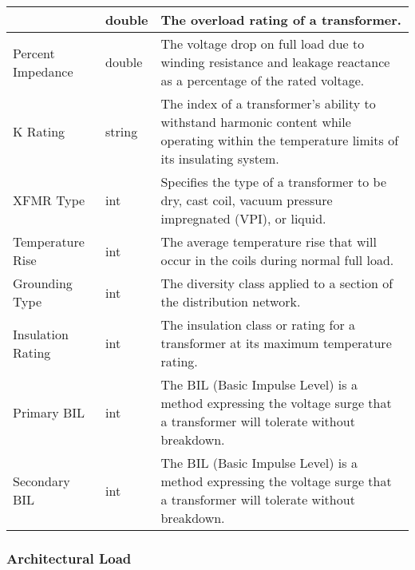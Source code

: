 \documentclass[letterpaper,10pt,english]{sphinxmanual}
\begin{document}
\begin{savenotes}
\begin{tabulary}{\linewidth}[t]{|T|T|T|}
&
double
&
The overload rating of a transformer.
\\
\hline
Percent Impedance
&
double
&
The voltage drop on full load due to winding resistance and leakage reactance as a percentage of the rated voltage.
\\
\hline
K Rating
&
string
&
The index of a transformer’s ability to withstand harmonic content while operating within the temperature limits of its insulating system.
\\
\hline
XFMR Type
&
int
&
Specifies the type of a transformer to be dry, cast coil, vacuum pressure impregnated (VPI), or liquid.
\\
\hline
Temperature Rise
&
int
&
The average temperature rise that will occur in the coils during normal full load.
\\
\hline
Grounding Type
&
int
&
The diversity class applied to a section of the distribution network.
\\
\hline
Insulation Rating
&
int
&
The insulation class or rating for a transformer at its maximum temperature rating.
\\
\hline
Primary BIL
&
int
&
The BIL (Basic Impulse Level) is a method expressing the voltage surge that a transformer will tolerate without breakdown.
\\
\hline
Secondary BIL
&
int
&
The BIL (Basic Impulse Level) is a method expressing the voltage surge that a transformer will tolerate without breakdown.
\\
\hline
\end{tabulary}
\par
\sphinxattableend\end{savenotes}


\subsubsection{Architectural Load}
\label{\detokenize{docs/definitions/index-definitions:architectural-load}}\label{\detokenize{docs/definitions/index-definitions:architectural-load-definition}}
\end{document}
